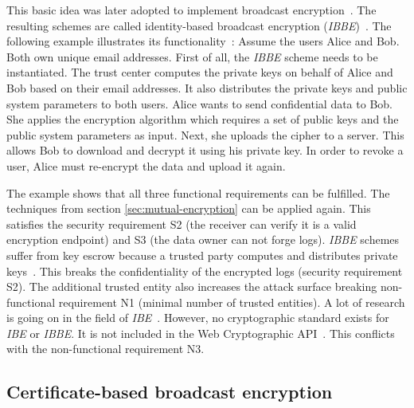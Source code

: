\documentclass[../main.tex]{subfiles}
\begin{document}
This basic idea was later adopted to implement broadcast encryption~\cite{Hagg2022}.
The resulting schemes are called identity-based broadcast encryption (\textit{IBBE})~\cite{Sakai2007}.
The following example illustrates its functionality~\cite{Hagg2022}:
Assume the users Alice and Bob.
Both own unique email addresses.
First of all, the \textit{IBBE} scheme needs to be instantiated.
The trust center computes the private keys on behalf of Alice and Bob based on their email addresses.
It also distributes the private keys and public system parameters to both users.
Alice wants to send confidential data to Bob.
She applies the encryption algorithm which requires a set of public keys and the public system parameters as input.
Next, she uploads the cipher to a server.
This allows Bob to download and decrypt it using his private key.
In order to revoke a user, Alice must re-encrypt the data and upload it again.

The example shows that all three functional requirements can be fulfilled.
The techniques from section \ref{sec:mutual-encryption} can be applied again.
This satisfies the security requirement S2 (the receiver can verify it is a valid encryption endpoint) and S3 (the data owner can not forge logs).
\textit{IBBE} schemes suffer from key escrow because a trusted party computes and distributes private keys~\cite{Hagg2022}.
This breaks the confidentiality of the encrypted logs (security requirement S2).
The additional trusted entity also increases the attack surface breaking non-functional requirement N1 (minimal number of trusted entities).
A lot of research is going on in the field of \textit{IBE}~\cite{Hagg2022}.
However, no cryptographic standard exists for \textit{IBE} or \textit{IBBE}.
It is not included in the Web Cryptographic API~\cite{WebCryptoApi2017}.
This conflicts with the non-functional requirement N3.

\subsection{Certificate-based broadcast encryption}
\label{sec:broadcast-certificate}
\end{document}
